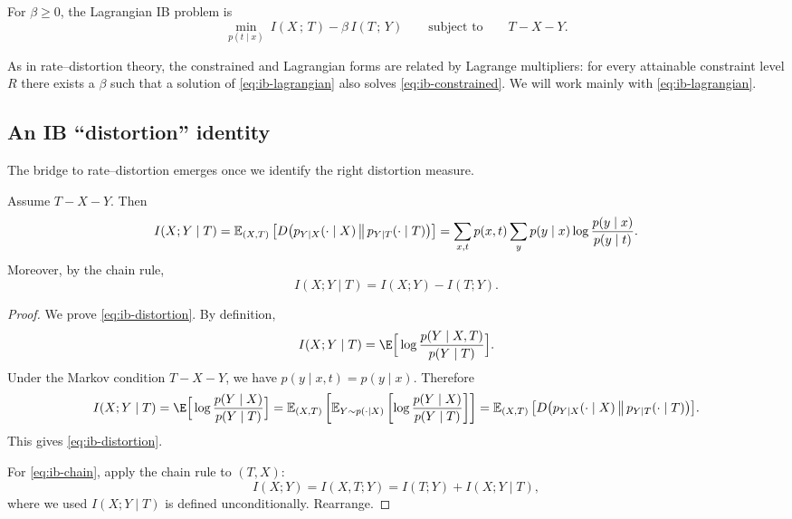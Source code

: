 \documentclass{article}
\numberwithin{equation}{section}
\newcommand{\mathify}[1]{\ifmmode{#1}\else\mbox{$#1$}\fi}
\newcommand{\Esub}[2]{\mathify{\mathbb{E}_{#1}\left[#2\right]}}
\newcommand{\KL}[2]{D\!\left(#1\,\middle\|\,#2\right)}
\newcommand{\MI}[2]{I\!\left(#1\,;\,#2\right)}
\begin{document}
\begin{definition}
For $\beta\ge 0$, the Lagrangian IB problem is
\begin{equation}
\label{eq:ib-lagrangian}
    \min_{p(t\mid x)}\ \MI{X}{T} - \beta\,\MI{T}{Y}
    \qquad \text{subject to}\qquad T-X-Y.
\end{equation}
\end{definition}

\begin{remark}
As in rate--distortion theory, the constrained and Lagrangian forms are related by Lagrange multipliers:
for every attainable constraint level $R$ there exists a $\beta$ such that a solution of \eqref{eq:ib-lagrangian} also solves \eqref{eq:ib-constrained}.
We will work mainly with \eqref{eq:ib-lagrangian}.
\end{remark}

\subsection{An IB ``distortion'' identity}

The bridge to rate--distortion emerges once we identify the right distortion measure.

\begin{lemma}
\label{lem:ib-distortion}
Assume $T-X-Y$.
Then
\begin{equation}
\label{eq:ib-distortion}
    I(X;Y\mid T)
    = \Esub{(X,T)}{\KL{p_{Y\mid X}(\cdot\mid X)}{p_{Y\mid T}(\cdot\mid T)}}
    = \sum_{x,t} p(x,t)\sum_{y} p(y\mid x)\log\frac{p(y\mid x)}{p(y\mid t)}.
\end{equation}
Moreover, by the chain rule,
\begin{equation}
\label{eq:ib-chain}
    I(X;Y\mid T) = I(X;Y) - I(T;Y).
\end{equation}
\end{lemma}
\begin{proof}
We prove \eqref{eq:ib-distortion}.
By definition,
\begin{equation}
    I(X;Y\mid T)
    = \E\Big[\log\frac{p(Y\mid X,T)}{p(Y\mid T)}\Big].
\end{equation}
Under the Markov condition $T-X-Y$, we have $p(y\mid x,t)=p(y\mid x)$.
Therefore
\begin{equation}
    I(X;Y\mid T)
    = \E\Big[\log\frac{p(Y\mid X)}{p(Y\mid T)}\Big]
    = \Esub{(X,T)}{\Esub{Y\sim p(\cdot\mid X)}{\log\frac{p(Y\mid X)}{p(Y\mid T)}}}
    = \Esub{(X,T)}{\KL{p_{Y\mid X}(\cdot\mid X)}{p_{Y\mid T}(\cdot\mid T)}}.
\end{equation}
This gives \eqref{eq:ib-distortion}.

For \eqref{eq:ib-chain}, apply the chain rule to $(T,X)$:
\begin{equation}
    I(X;Y) = I(X,T;Y) = I(T;Y) + I(X;Y\mid T),
\end{equation}
where we used $I(X;Y\mid T)$ is defined unconditionally.
Rearrange.
\end{proof}
\end{document}
